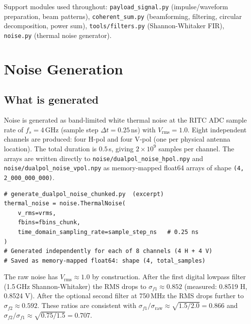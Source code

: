 \documentclass[11pt,letterpaper]{article}
\newenvironment{codebox}{%
  \begin{mdframed}[backgroundcolor=codebg,linewidth=0.5pt,innerleftmargin=6pt,innerrightmargin=6pt,innertopmargin=4pt,innerbottommargin=4pt]%
  \small}{\end{mdframed}}
\newenvironment{notebox}{%
  \begin{mdframed}[backgroundcolor=notebg,linewidth=0.5pt,frametitle={\small\textbf{Note}},innerleftmargin=6pt]}%
  {\end{mdframed}}}
\begin{document}
Support modules used throughout:
\texttt{payload\_signal.py} (impulse/waveform preparation, beam patterns),
\texttt{coherent\_sum.py} (beamforming, filtering, circular decomposition, power sum),
\texttt{tools/filters.py} (Shannon-Whitaker FIR),
\texttt{noise.py} (thermal noise generator).

\section{Noise Generation}

\subsection{What is generated}

Noise is generated as band-limited white thermal noise at the RITC ADC sample
rate of $f_s = 4$\,GHz (sample step $\Delta t = 0.25$\,ns) with
$V_\mathrm{rms} = 1.0$.  Eight independent channels are produced: four H-pol
and four V-pol (one per physical antenna location).  The total duration is
$0.5$\,s, giving $2 \times 10^9$ samples per channel.  The arrays are written
directly to \texttt{noise/dualpol\_noise\_hpol.npy} and
\texttt{noise/dualpol\_noise\_vpol.npy} as memory-mapped float64 arrays of
shape \texttt{(4, 2\_000\_000\_000)}.

\begin{codebox}
\begin{Verbatim}
# generate_dualpol_noise_chunked.py  (excerpt)
thermal_noise = noise.ThermalNoise(
    v_rms=vrms,
    fbins=fbins_chunk,
    time_domain_sampling_rate=sample_step_ns   # 0.25 ns
)
# Generated independently for each of 8 channels (4 H + 4 V)
# Saved as memory-mapped float64: shape (4, total_samples)
\end{Verbatim}
\end{codebox}

\begin{notebox}
The raw noise has $V_\mathrm{rms} \approx 1.0$ by construction. After the
first digital lowpass filter (1.5\,GHz Shannon-Whitaker) the RMS drops to
$\sigma_{f1} \approx 0.852$ (measured: 0.8519 H, 0.8524 V). After the
optional second filter at 750\,MHz the RMS drops further to
$\sigma_{f2} \approx 0.592$. These ratios are consistent with
$\sigma_{f1}/\sigma_\mathrm{raw} \approx \sqrt{1.5/2.0} = 0.866$ and
$\sigma_{f2}/\sigma_{f1} \approx \sqrt{0.75/1.5} = 0.707$.
\end{notebox}
\end{document}
